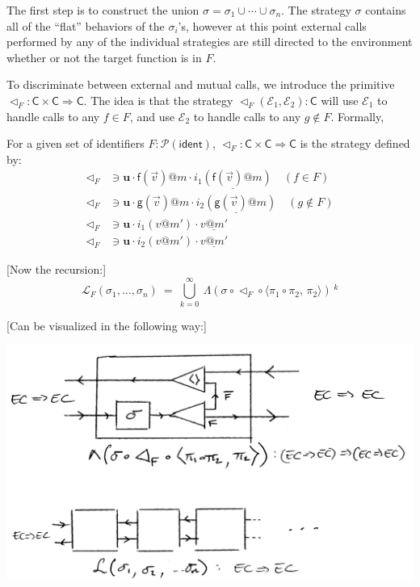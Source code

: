 \documentclass[acmsmall,anonymous]{acmart}
\makeatletter
\newcommand{\kw}[1]{\ensuremath{ \textsf{#1} }}
\newcommand{\EC}{\kw{C}}
\newcommand{\mcall}[3]{\kw{#1}({#2})@{#3}}
\newcommand{\mret}[2]{{#1}@{#2}}
\newcommand{\pret}[2]{%
  \underline{\mret{#1}{#2}}%
}
\makeatother
\begin{document}
The first step is to construct the union
$\sigma = \sigma_1 \cup \cdots \cup \sigma_n$.
The strategy $\sigma$
contains all of the ``flat'' behaviors of the $\sigma_i$'s,
however at this point
external calls performed by any of the individual strategies
are still directed to the environment
whether or not the target function is in $F$.

To discriminate between external and mutual calls,
we introduce the primitive $\lhd_F : \EC \times \EC \Rightarrow \EC$.
The idea is that the strategy $\lhd_F(\mathcal{E}_1, \mathcal{E}_2) : \EC$
will use $\mathcal{E}_1$ to handle calls to any $f \in F$,
and use $\mathcal{E}_2$ to handle calls to any $g \notin F$.
Formally,
\begin{definition}[$\lhd_F$]
For a given set of identifiers $F : \mathcal{P}(\kw{ident})$,
$\lhd_F : \EC \times \EC \Rightarrow \EC$ is the strategy defined by:
\begin{align*}
  \lhd_F &\ni
    \mathbf{u} \cdot
    \mcall{f}{\vec{v}}{m} \cdot
    \underline{i_1(\mcall{f}{\vec{v}}{m})}
    \quad (f \in F) \\
  \lhd_F &\ni
    \mathbf{u} \cdot
    \mcall{g}{\vec{v}}{m} \cdot
    \underline{i_2(\mcall{g}{\vec{v}}{m})}
    \quad (g \notin F) \\
  \lhd_F &\ni
    \mathbf{u} \cdot
    i_1(\mret{v}{m'}) \cdot
    \pret{v}{m'} \\
  \lhd_F &\ni
    \mathbf{u} \cdot
    i_2(\mret{v}{m'}) \cdot
    \pret{v}{m'}
\end{align*}
\end{definition}

[Now the recursion:]
\[
  \mathcal{L}_F(\sigma_1, \ldots, \sigma_n) \ =\ 
    \bigcup_{k=0}^\infty\ 
    \Lambda ( \sigma \circ \lhd_F \circ \langle \pi_1 \circ \pi_2, \, \pi_2 \rangle ) \,^k
\]

[Can be visualized in the following way:]
\begin{center}
  \includegraphics[scale=0.5]{linking-operator}
\end{center}
\end{document}
